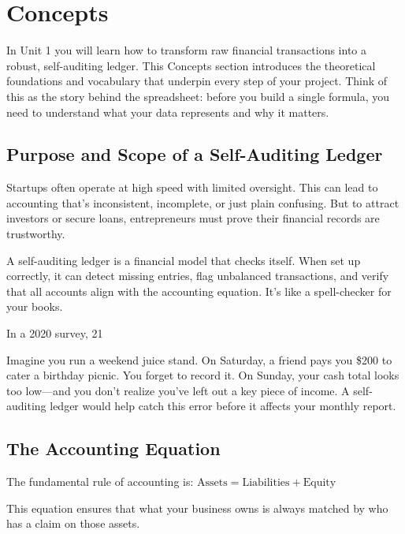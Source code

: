 \section{Concepts}
\label{sec\:unit1\_concepts}

In Unit 1 you will learn how to transform raw financial transactions into a robust, self-auditing ledger. This Concepts section introduces the theoretical foundations and vocabulary that underpin every step of your project. Think of this as the story behind the spreadsheet: before you build a single formula, you need to understand what your data represents and why it matters.

\subsection{Purpose and Scope of a Self-Auditing Ledger}
Startups often operate at high speed with limited oversight. This can lead to accounting that’s inconsistent, incomplete, or just plain confusing. But to attract investors or secure loans, entrepreneurs must prove their financial records are trustworthy.

A self-auditing ledger is a financial model that checks itself. When set up correctly, it can detect missing entries, flag unbalanced transactions, and verify that all accounts align with the accounting equation. It’s like a spell-checker for your books.

\begin{Trivia}
In a 2020 survey, 21%
\end{Trivia}

\begin{Example}
Imagine you run a weekend juice stand. On Saturday, a friend pays you \$200 to cater a birthday picnic. You forget to record it. On Sunday, your cash total looks too low—and you don’t realize you’ve left out a key piece of income. A self-auditing ledger would help catch this error before it affects your monthly report.
\end{Example}

\subsection{The Accounting Equation}
The fundamental rule of accounting is:
$\text{Assets} = \text{Liabilities} + \text{Equity}$

This equation ensures that what your business owns is always matched by who has a claim on those assets.


